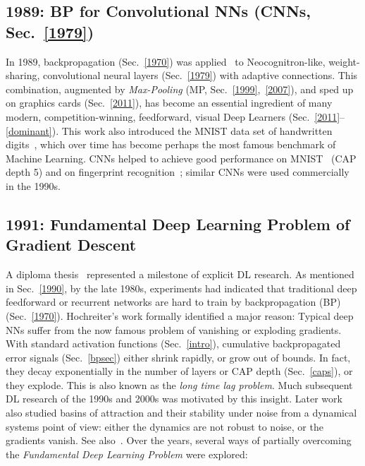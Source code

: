 \documentclass[letterpaper]{article}
\begin{document}
\begin{CJK*}{UTF8}{gbsn}
\subsection{1989: BP for Convolutional NNs (CNNs, Sec.~\ref{1979})}
\label{1989}
In 1989, backpropagation (Sec.~\ref{1970}) was applied~\citep{LeCun:89,LeCun:90,LeCun:98} 
to Neocognitron-like, weight-sharing,
convolutional 
neural layers (Sec.~\ref{1979}) with adaptive connections.
This combination, augmented by {\em Max-Pooling} (MP, Sec.~\ref{1999},~\ref{2007}),
and sped up on graphics cards (Sec.~\ref{2011}),  
has become an 
essential ingredient of many modern, competition-winning, 
feedforward, visual Deep Learners (Sec.~\ref{2011}--\ref{dominant}).
This work also introduced
the MNIST data set of handwritten digits~\citep{LeCun:89}, which over time has become 
perhaps the most famous benchmark of Machine Learning. 
CNNs helped to 
achieve good performance on MNIST~\citep{LeCun:90} (CAP depth 5)
and on  fingerprint recognition~\citep{baldi93finger};
similar CNNs were used commercially in the 1990s.




\subsection{1991: Fundamental Deep Learning Problem of Gradient Descent}
\label{1991a}
 
A diploma thesis~\citep{Hochreiter:91} represented a milestone of explicit
DL research. As mentioned in Sec.~\ref{1990}, by the late 1980s, 
experiments had indicated that traditional 
deep feedforward or recurrent networks are hard to
train by backpropagation (BP) (Sec.~\ref{1970}). Hochreiter's work
formally identified a major reason: Typical deep NNs suffer from the now famous problem of vanishing or exploding gradients. With standard activation functions (Sec.~\ref{intro}), cumulative 
 backpropagated error signals (Sec.~\ref{bpsec})  either shrink rapidly, or grow out of bounds. In fact, they decay exponentially in the number of layers or CAP depth (Sec.~\ref{caps}), 
or they explode. 
This is also known as the {\em long time lag problem}.
Much subsequent DL research of the 1990s and 2000s was motivated by this insight. 
Later work~\citep{Bengio:94} also studied
basins of attraction and their stability under noise 
from a dynamical systems point of view: either the 
dynamics are not robust to noise, or the gradients vanish. See also~\citep{Hochreiter:01book,Tino03NC}.
Over the years, several ways of partially overcoming the {\em Fundamental Deep Learning Problem} were explored:


\end{CJK*}
\end{document}
